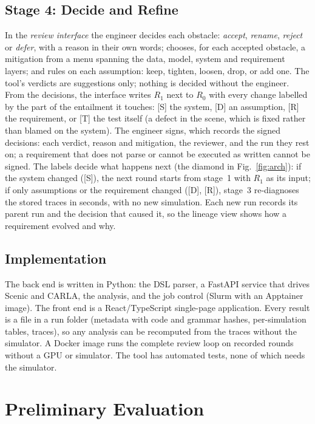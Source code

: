 \subsection{Stage 4: Decide and Refine}
\label{sec:decide}
In the \emph{review interface} the engineer decides each obstacle:
\emph{accept}, \emph{rename}, \emph{reject} or \emph{defer}, with a reason
in their own words; chooses, for each accepted obstacle, a mitigation from a
menu spanning the data, model, system and requirement layers; and rules on
each assumption: keep, tighten, loosen, drop, or add one. The tool's verdicts
are suggestions only; nothing is decided without the engineer. From the decisions, the interface writes $R_1$ next to $R_0$ with every
change labelled by the part of the entailment it touches: [S] the
system, [D] an assumption, [R] the requirement, or [T] the test itself (a
defect in the scene, which is fixed rather than blamed on the system). The
engineer signs, which records the signed decisions: each verdict, reason and
mitigation, the reviewer, and the run they rest on; a requirement that does
not parse or cannot be executed as written cannot be signed. The labels
decide what happens next (the diamond in Fig.~\ref{fig:arch}): if the system
changed ([S]), the next round starts from stage~1 with $R_1$ as its input; if
only assumptions or the requirement changed ([D], [R]), stage~3 re-diagnoses
the stored traces in seconds, with no new simulation. Each new run records
its parent run and the decision that caused it, so the lineage view shows how
a requirement evolved and why.

\subsection{Implementation}
\label{sec:impl}
The back end is written in Python: the DSL parser, a FastAPI service that
drives Scenic and CARLA, the analysis, and the job control (Slurm with an
Apptainer image). The front end is a React/TypeScript single-page
application. Every result is a file in a run folder (metadata with code and
grammar hashes, per-simulation tables, traces), so any analysis can be
recomputed from the traces without the simulator. A Docker image runs the
complete review loop on recorded rounds without a GPU or simulator. The tool
has  automated tests, none of which needs the simulator.

\section{Preliminary Evaluation}
\label{sec:eval}

